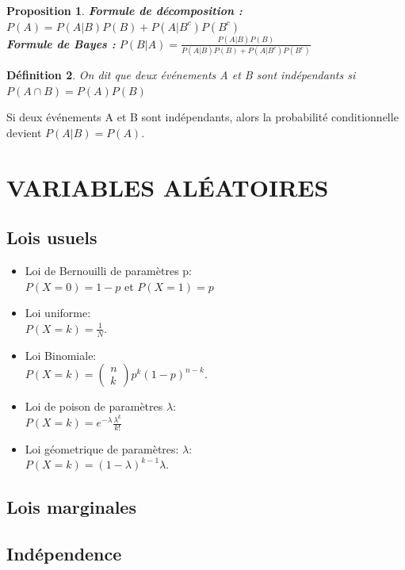 \documentclass[a4paper, 12pt, french]{report}
\theoremstyle{break}
\newtheorem{defin}{Définition}[section]
\newtheorem{prop}[defin]{Proposition}
\begin{document}
\begin{prop}
\textbf{Formule de décomposition :} $P(A) = P(A | B)P(B) + P(A | B^{c}) P(B^{c})$ \\
\textbf{Formule de Bayes :} $ P(B | A) = \displaystyle\frac{P(A | B) P(B)}{P(A | B)P(B) + P(A | B^{c}) P(B^{c})}$
\end{prop}

\begin{defin}
On dit que deux événements A et B sont indépendants si $P(A \cap B) = P(A)P(B)$
\end{defin}
Si deux événements A et B sont indépendants, alors la probabilité conditionnelle devient $P(A|B)=P(A)$.

\chapter{VARIABLES ALÉATOIRES}
\section{Lois usuels}
\begin{itemize}
	\item Loi de Bernouilli de paramètres p: \\
	$P(X=0) = 1-p$ et $P(X=1)=p$

	\item Loi uniforme: \\
	$P(X = k)=\displaystyle\frac{1}{N}$.

	\item Loi Binomiale: \\
	$P(X=k)= \left(\begin{array}{c} n \\ k\end{array}\right) p^{k}(1-p)^{n-k}$.

	\item Loi de poison de paramètres $\lambda$: \\
	$P(X=k)=e^{-\lambda} \frac{\lambda^{k}}{k!}$

	\item Loi géometrique de paramètres: $\lambda$: \\
	$P(X=k)=(1-\lambda)^{k-1}\lambda$.
\end{itemize}

\section{Lois marginales}

\section{Indépendence}
\end{document}
